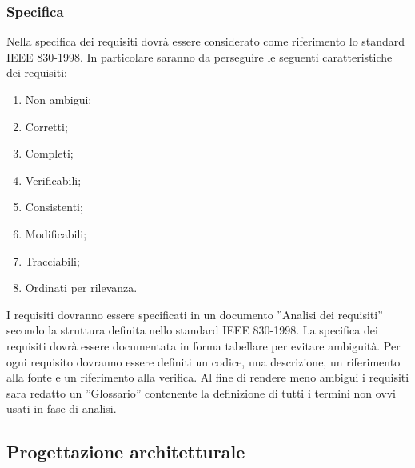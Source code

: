 {			\subsubsection{Specifica}{
				Nella specifica dei requisiti dovrà essere considerato come riferimento lo standard IEEE 830-1998. In particolare saranno da perseguire le seguenti caratteristiche dei requisiti:
				\begin{enumerate}
					\item Non ambigui;
					\item Corretti;
					\item Completi;
					\item Verificabili;
					\item Consistenti;
					\item Modificabili;
					\item Tracciabili;
					\item Ordinati per rilevanza.
				\end{enumerate}
				I requisiti dovranno essere specificati in un documento ”Analisi dei requisiti” secondo la struttura definita nello standard IEEE 830-1998. La specifica dei requisiti dovrà essere documentata in forma tabellare per evitare ambiguità. Per ogni requisito dovranno essere definiti un codice, una descrizione, un riferimento alla fonte e un riferimento alla verifica. Al fine di rendere meno ambigui i requisiti sara redatto un ”Glossario” contenente la definizione di tutti i termini non ovvi usati in fase di analisi.
			}

		}


   \subsection{Progettazione architetturale}
   

